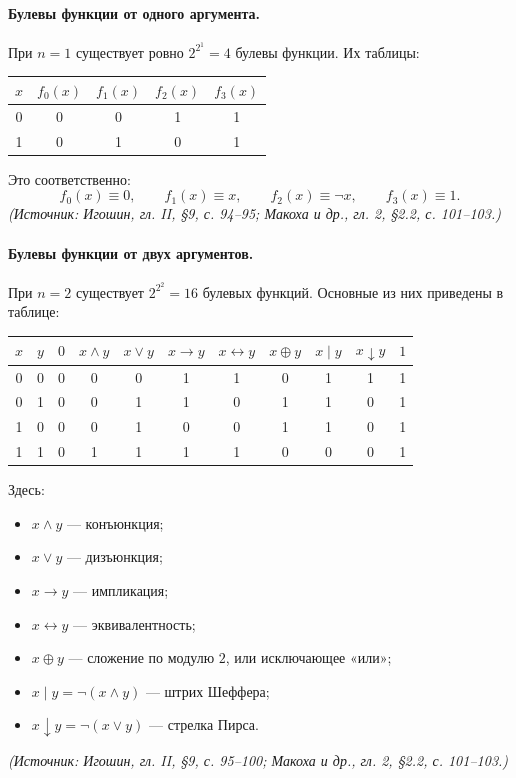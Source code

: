 \documentclass[a4paper,12pt]{article}
\begin{document}
\paragraph{Булевы функции от одного аргумента.}
При \(n=1\) существует ровно \(2^{2^1}=4\) булевы функции. Их таблицы:
\begin{center}
\begin{tabular}{c|cccc}
\toprule
\(x\) & \(f_0(x)\) & \(f_1(x)\) & \(f_2(x)\) & \(f_3(x)\)\\
\midrule
0 & 0 & 0 & 1 & 1\\
1 & 0 & 1 & 0 & 1\\
\bottomrule
\end{tabular}
\end{center}
Это соответственно:
\[
f_0(x)\equiv 0,\qquad
f_1(x)\equiv x,\qquad
f_2(x)\equiv\neg x,\qquad
f_3(x)\equiv 1.
\]
\textit{(Источник: Игошин, гл. II, §9, с. 94--95; Макоха и др., гл. 2, §2.2, с. 101--103.)}

\paragraph{Булевы функции от двух аргументов.}
При \(n=2\) существует \(2^{2^2}=16\) булевых функций. Основные из них приведены в таблице:
\begin{center}
\begin{tabular}{cc|ccccccccc}
\toprule
\(x\) & \(y\) & \(0\) & \(x\land y\) & \(x\lor y\) & \(x\to y\) & \(x\leftrightarrow y\) & \(x\oplus y\) & \(x\mid y\) & \(x\downarrow y\) & \(1\)\\
\midrule
0 & 0 & 0 & 0 & 0 & 1 & 1 & 0 & 1 & 1 & 1\\
0 & 1 & 0 & 0 & 1 & 1 & 0 & 1 & 1 & 0 & 1\\
1 & 0 & 0 & 0 & 1 & 0 & 0 & 1 & 1 & 0 & 1\\
1 & 1 & 0 & 1 & 1 & 1 & 1 & 0 & 0 & 0 & 1\\
\bottomrule
\end{tabular}
\end{center}
Здесь:
\begin{itemize}
\item \(x\land y\) — конъюнкция;
\item \(x\lor y\) — дизъюнкция;
\item \(x\to y\) — импликация;
\item \(x\leftrightarrow y\) — эквивалентность;
\item \(x\oplus y\) — сложение по модулю \(2\), или исключающее «или»;
\item \(x\mid y=\neg(x\land y)\) — штрих Шеффера;
\item \(x\downarrow y=\neg(x\lor y)\) — стрелка Пирса.
\end{itemize}
\textit{(Источник: Игошин, гл. II, §9, с. 95--100; Макоха и др., гл. 2, §2.2, с. 101--103.)}
\end{document}
